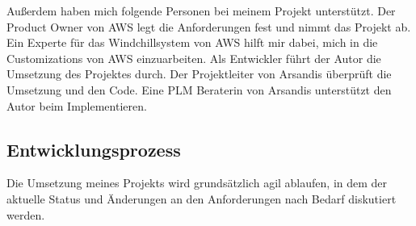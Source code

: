 Außerdem haben mich folgende Personen bei meinem Projekt unterstützt.
Der Product Owner von \acs{AWS} legt die Anforderungen fest und nimmt das Projekt ab.
Ein Experte für das Windchillsystem von \acs{AWS} hilft mir dabei, mich in die Customizations von \acs{AWS} einzuarbeiten.
Als Entwickler führt der Autor die Umsetzung des Projektes durch.
Der Projektleiter von Arsandis überprüft die Umsetzung und den Code.
Eine PLM Beraterin von Arsandis unterstützt den Autor beim Implementieren.

\subsection{Entwicklungsprozess}
\label{sec:Entwicklungsprozess}

Die Umsetzung meines Projekts wird grundsätzlich agil ablaufen, in dem der aktuelle Status und Änderungen an den Anforderungen nach Bedarf diskutiert werden.

